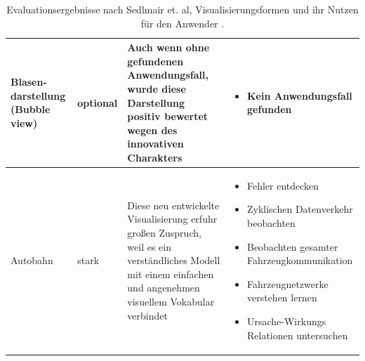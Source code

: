 \documentclass[draft=false
              ,paper=a4
              ,twoside=false
              ,fontsize=11pt
              ,headsepline
              ,BCOR10mm
              ,DIV11
              ]{scrbook}
\begin{document}
\begin{table}[htbp]
\begin{tabularx}{\textwidth}{X|l|X|p{5cm}}
    Blasen-\newline darstellung (Bubble view) & optional & Auch wenn ohne gefundenen Anwendungsfall, wurde diese Darstellung positiv bewertet wegen des innovativen Charakters &
    \begin{itemize}[noitemsep,nolistsep]
      \item Kein Anwendungsfall gefunden
    \end{itemize} \\ \hline
    Autobahn & stark & Diese neu entwickelte Visualisierung erfuhr großen Zuspruch, weil es ein verständliches Modell mit einem einfachen und angenehmen visuellem Vokabular verbindet  &
    \begin{itemize}[noitemsep,nolistsep]
      \item Fehler entdecken
      \item Zyklischen Datenverkehr beobachten
      \item Beobachten gesamter Fahrzeugkommunikation
      \item Fahrzeugnetzwerke verstehen lernen
      \item Ursache-Wirkungs Relationen untersuchen
    \end{itemize} \\ \hline   
  \end{tabularx}
  \caption{Evaluationsergebnisse nach Sedlmair et. al, Visualisierungsformen und ihr Nutzen für den Anwender \cite{sedlmair2009}.}
    \label{tab:eval}
\end{table}
\newpage
\end{document}
